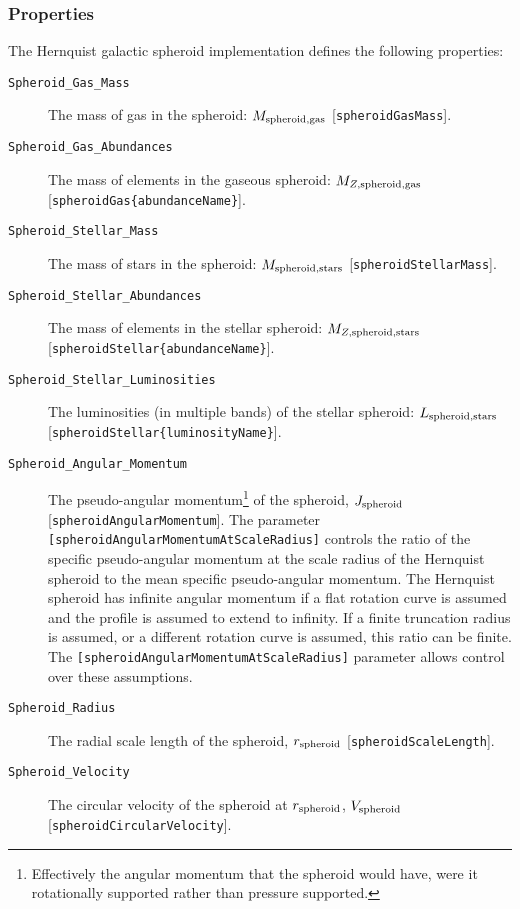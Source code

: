 \subsubsection{Properties}

The Hernquist galactic spheroid implementation defines the following properties:
\begin{description}
 \item [{\tt Spheroid\_Gas\_Mass}] The mass of gas in the spheroid: $M_{\rm spheroid, gas}$ [{\tt spheroidGasMass}].
 \item [{\tt Spheroid\_Gas\_Abundances}] The mass of elements in the gaseous spheroid: $M_{Z, {\rm spheroid, gas}}$ [{\tt spheroidGas\{abundanceName\}}].
 \item [{\tt Spheroid\_Stellar\_Mass}] The mass of stars in the spheroid: $M_{\rm spheroid, stars}$ [{\tt spheroidStellarMass}].
 \item [{\tt Spheroid\_Stellar\_Abundances}] The mass of elements in the stellar spheroid: $M_{Z, {\rm spheroid, stars}}$ [{\tt spheroidStellar\{abundanceName\}}].
 \item [{\tt Spheroid\_Stellar\_Luminosities}] The luminosities (in multiple bands) of the stellar spheroid: $L_{\rm spheroid, stars}$ [{\tt spheroidStellar\{luminosityName\}}].
 \item [{\tt Spheroid\_Angular\_Momentum}] The pseudo-angular momentum\footnote{Effectively the angular momentum that the spheroid would have, were it rotationally supported rather than pressure supported.} of the spheroid, $J_{\rm spheroid}$ [{\tt spheroidAngularMomentum}]. The parameter {\tt [spheroidAngularMomentumAtScaleRadius]} controls the ratio of the specific pseudo-angular momentum at the scale radius of the Hernquist spheroid to the mean specific pseudo-angular momentum. The Hernquist spheroid has infinite angular momentum if a flat rotation curve is assumed and the profile is assumed to extend to infinity. If a finite truncation radius is assumed, or a different rotation curve is assumed, this ratio can be finite. The {\tt [spheroidAngularMomentumAtScaleRadius]} parameter allows control over these assumptions.
 \item [{\tt Spheroid\_Radius}] The radial scale length of the spheroid, $r_{\rm spheroid}$ [{\tt spheroidScaleLength}].
 \item [{\tt Spheroid\_Velocity}] The circular velocity of the spheroid at $r_{\rm spheroid}$, $V_{\rm spheroid}$ [{\tt spheroidCircularVelocity}].
\end{description}
